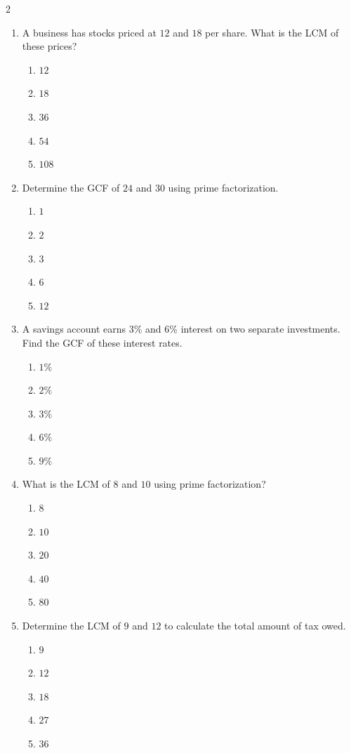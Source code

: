 \documentclass[10pt]{article}
\begin{document}
\begin{multicols}{2}
\begin{enumerate}[label=\textbf{Q\arabic*.}, leftmargin=*, itemsep=6pt, parsep=0pt]
  \item \small A business has stocks priced at $12$ and $18$ per share. What is the LCM of these prices?
  \begin{enumerate}[label=(\Alph*), leftmargin=0.6cm, nosep, itemsep=2pt]
    \item $12$
    \item $18$
    \item $36$
    \item $54$
    \item $108$
  \end{enumerate}

  \item \small Determine the GCF of $24$ and $30$ using prime factorization.
  \begin{enumerate}[label=(\Alph*), leftmargin=0.6cm, nosep, itemsep=2pt]
    \item $1$
    \item $2$
    \item $3$
    \item $6$
    \item $12$
  \end{enumerate}

  \item \small A savings account earns $3\%$ and $6\%$ interest on two separate investments. Find the GCF of these interest rates.
  \begin{enumerate}[label=(\Alph*), leftmargin=0.6cm, nosep, itemsep=2pt]
    \item $1\%$
    \item $2\%$
    \item $3\%$
    \item $6\%$
    \item $9\%$
  \end{enumerate}

  \item \small What is the LCM of $8$ and $10$ using prime factorization?
  \begin{enumerate}[label=(\Alph*), leftmargin=0.6cm, nosep, itemsep=2pt]
    \item $8$
    \item $10$
    \item $20$
    \item $40$
    \item $80$
  \end{enumerate}

  \item \small Determine the LCM of $9$ and $12$ to calculate the total amount of tax owed.
  \begin{enumerate}[label=(\Alph*), leftmargin=0.6cm, nosep, itemsep=2pt]
    \item $9$
    \item $12$
    \item $18$
    \item $27$
    \item $36$
  \end{enumerate}

\end{enumerate}
\end{multicols}
\end{document}
